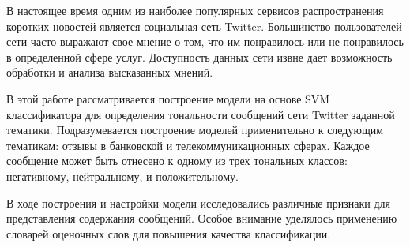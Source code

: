 
В настоящее время одним из наиболее популярных сервисов распространения коротких
новостей является социальная сеть Twitter. Большинство пользователей сети часто
выражают свое мнение о том, что им понравилось или не понравилось в определенной
сфере услуг. Доступность данных сети извне дает возможность обработки и анализа
высказанных мнений.

В этой работе рассматривается построение модели на основе SVM классификатора для
определения тональности сообщений сети Twitter заданной тематики. Подразумевается
построение моделей применительно к следующим тематикам: отзывы в банковской и
телекоммуникационных сферах. Каждое сообщение может быть отнесено к одному из
трех тональных классов: негативному, нейтральному, и положительному.

В ходе построения и настройки модели исследовались различные признаки для
представления содержания сообщений. Особое внимание уделялось применению
словарей оценочных слов для повышения качества классификации.
